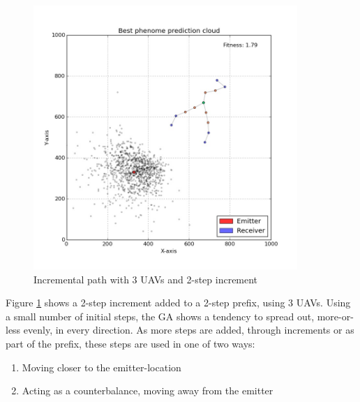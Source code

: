 \documentclass[10pt,a4paper]{book}
\begin{document}
\begin{figure}[H]
\centering
\includegraphics[width=100mm]{incr2steps/3uavs.jpg}
\caption{Incremental path with 3 \glspl{UAV} and 2-step increment}
\label{incrpath_uav3_step2}
\end{figure}


Figure \ref{incrpath_uav3_step2} shows a 2-step increment added to a 2-step prefix, using 3 \glspl{UAV}. Using a small number of initial steps, the \gls{GA} shows a tendency to spread out, more-or-less evenly, in every direction. As more steps are added, through increments or as part of the prefix, these steps are used in one of two ways:

\begin{enumerate}
\item Moving closer to the emitter-location
\item Acting as a counterbalance, moving away from the emitter
\end{enumerate}
\end{document}
